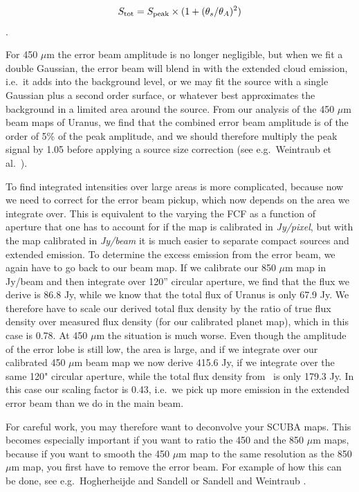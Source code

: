 \documentclass[twoside,11pt,noabs]{starlink}
\providecommand{\fluxes}{\xref{\textsc{Fluxes}}{sun213}{}}
\begin{document}
\begin{equation}
S_{\rm tot} = S_{\rm peak} \times (1 +(\theta_{s}/\theta_{A})^2)   \end{equation}.

For 450 $\mu$m the error beam amplitude is no longer negligible, but
when we fit a double Gaussian, the error beam will blend in with the
extended cloud emission, i.e.\ it adds into the background level, or we
may fit the source with a single Gaussian plus a second order surface,
or whatever best approximates the background in a limited area around
the source.  From our analysis of the 450 $\mu$m beam maps of Uranus,
we find that the combined error beam amplitude is of the order of 5\%
of the peak amplitude, and we should therefore multiply the peak
signal by 1.05 before applying a source size correction (see e.g.\
Weintraub et al.\  \cite{Weintraub99}).


To find integrated intensities over large areas is more complicated,
because now we need to correct for the error beam pickup, which now
depends on the area we integrate over.  This is equivalent to the
varying the FCF as a function of aperture that one has to account for
if the map is calibrated in \textit{Jy/pixel}, but with the map
calibrated in \textit{Jy/beam} it is much easier to separate compact
sources and extended emission.  To determine the excess emission from
the error beam, we again have to go back to our beam map.  If we
calibrate our 850 $\mu$m map in Jy/beam and then integrate over 120''
circular aperture, we find that the flux we derive is 86.8 Jy, while
we know that the total flux of Uranus is only 67.9 Jy.  We therefore
have to scale our derived total flux density by the ratio of true flux
density over measured flux density (for our calibrated planet map),
which in this case is 0.78.  At 450 $\mu$m the situation is much
worse.  Even though the amplitude of the error lobe is still low, the
area is large, and if we integrate over our calibrated 450 $\mu$m beam
map we now derive 415.6 Jy, if we integrate over the same 120"
circular aperture, while the total flux density from \fluxes\ is only
179.3 Jy.  In this case our scaling factor is 0.43, i.e.\ we pick up
more emission in the extended error beam than we do in the main beam.

For careful work, you may therefore want to deconvolve your SCUBA
maps.  This becomes especially important if you want to ratio the 450
and the 850 $\mu$m maps, because if you want to smooth the 450 $\mu$m
map to the same resolution as the 850 $\mu$m map, you first have to
remove the error beam.  For example of how this can be done, see e.g.\
Hogherheijde and Sandell \cite{Hogherheijde00} or Sandell and
Weintraub \cite{Sandell01}.
\end{document}
